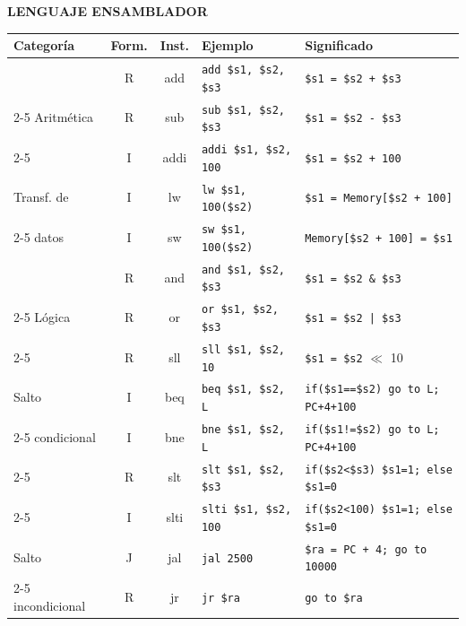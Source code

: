 \documentclass[10pt]{article}
\begin{document}
\begin{center}
    {\large \textbf{LENGUAJE ENSAMBLADOR}}
    \vspace{0.3cm}
    \normalsize 
    \setlength{\tabcolsep}{5pt} 
    \renewcommand{\arraystretch}{1.2} 

    \begin{tabular}{|l|c|c|l|l|}
    \hline
    \textbf{Categoría} & \textbf{Form.} & \textbf{Inst.} & \textbf{Ejemplo} & \textbf{Significado} \\ \hline
    & R & add & \texttt{add \$s1, \$s2, \$s3} & \texttt{\$s1 = \$s2 + \$s3} \\ \cline{2-5} 
    Aritmética & R & sub & \texttt{sub \$s1, \$s2, \$s3} & \texttt{\$s1 = \$s2 - \$s3} \\ \cline{2-5} 
    & I & addi & \texttt{addi \$s1, \$s2, 100} & \texttt{\$s1 = \$s2 + 100} \\ \hline

    Transf. de & I & lw & \texttt{lw \$s1, 100(\$s2)} & \texttt{\$s1 = Memory[\$s2 + 100]} \\ \cline{2-5} 
    datos & I & sw & \texttt{sw \$s1, 100(\$s2)} & \texttt{Memory[\$s2 + 100] = \$s1} \\ \hline

    & R & and & \texttt{and \$s1, \$s2, \$s3} & \texttt{\$s1 = \$s2 \& \$s3} \\ \cline{2-5} 
    Lógica & R & or & \texttt{or \$s1, \$s2, \$s3} & \texttt{\$s1 = \$s2 | \$s3} \\ \cline{2-5} 
    & R & sll & \texttt{sll \$s1, \$s2, 10} & \texttt{\$s1 = \$s2} $\ll$ 10 \\ \hline

    Salto & I & beq & \texttt{beq \$s1, \$s2, L} & \texttt{if(\$s1==\$s2) go to L; PC+4+100} \\ \cline{2-5} 
    condicional & I & bne & \texttt{bne \$s1, \$s2, L} & \texttt{if(\$s1!=\$s2) go to L; PC+4+100} \\ \cline{2-5} 
    & R & slt & \texttt{slt \$s1, \$s2, \$s3} & \texttt{if(\$s2<\$s3) \$s1=1; else \$s1=0} \\ \cline{2-5} 
    & I & slti & \texttt{slti \$s1, \$s2, 100} & \texttt{if(\$s2<100) \$s1=1; else \$s1=0} \\ \hline

    Salto & J & jal & \texttt{jal 2500} & \texttt{\$ra = PC + 4; go to 10000} \\ \cline{2-5} 
    incondicional & R & jr & \texttt{jr \$ra} & \texttt{go to \$ra} \\ \hline
    \end{tabular}
\end{center}
\end{document}
